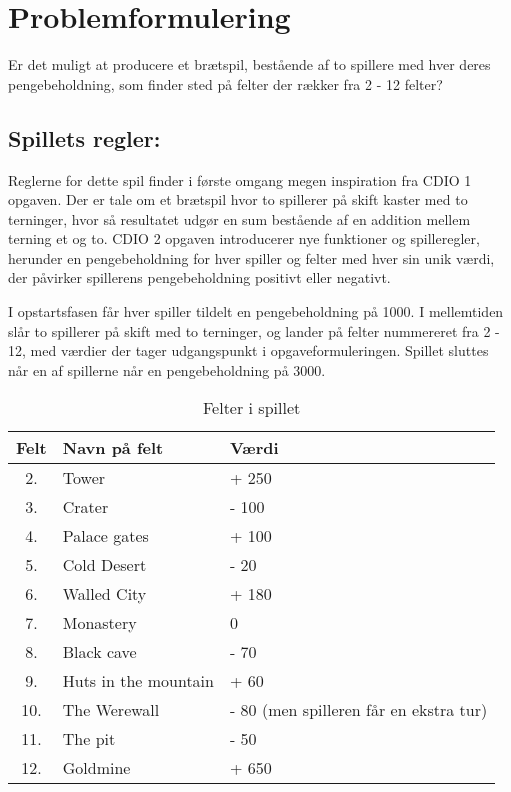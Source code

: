 \chapter{Problemformulering}
Er det muligt at producere et brætspil, bestående af to spillere med hver deres pengebeholdning, som finder sted på felter der rækker fra 2 - 12 felter?

\section*{Spillets regler:}
\label{Sec:rules}
Reglerne for dette spil finder i første omgang megen inspiration fra CDIO 1 opgaven.
Der er tale om et brætspil hvor to spillerer på skift kaster med to terninger, hvor så resultatet udgør en sum bestående af en addition mellem terning et og to.
CDIO 2 opgaven introducerer nye funktioner og spilleregler, herunder en pengebeholdning for hver spiller og felter med hver sin unik værdi, der påvirker spillerens pengebeholdning positivt eller negativt.

\vspace{5mm}

\noindent I opstartsfasen får hver spiller tildelt en pengebeholdning på 1000.
I mellemtiden slår to spillerer på skift med to terninger, og lander på felter nummereret fra 2 - 12, med værdier der tager udgangspunkt i opgaveformuleringen.
Spillet sluttes når en af spillerne når en pengebeholdning på 3000.

\vspace{5mm}
\begin{table}[H]
    \begin{center}
        \begin{tabular}{ | c | l | p{7cm}|}
            \hline
            \textbf{Felt} & \textbf{Navn på felt} & \textbf{Værdi} \\ \hline
            2.  &   Tower                   & + 250 \\ \hline
            3.  &   Crater                  & - 100 \\ \hline
            4.  &   Palace gates            & + 100 \\ \hline
            5.  &   Cold Desert             & - 20 \\ \hline
            6.  &   Walled City             & + 180 \\ \hline
            7.  &   Monastery               & 0 \\ \hline
            8.  &   Black cave              & - 70 \\ \hline
            9.  &   Huts in the mountain    & + 60 \\ \hline
            10. &   The Werewall            & - 80 
            (men spilleren får en ekstra tur) \\ \hline
            11. &   The pit                 & - 50 \\ \hline
            12. &   Goldmine                & + 650 \\ \hline
            \hline
        \end{tabular}
    \end{center}
    \caption{Felter i spillet}
    \label{table:fields}
\end{table}
